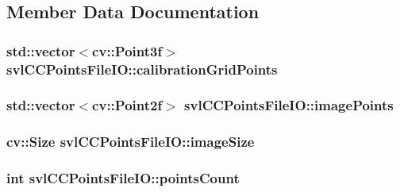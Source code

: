 \subsection{Member Data Documentation}
\hypertarget{classsvl_c_c_points_file_i_o_a72ec161d8c025afcf43920fe2dc27f79}{
\subsubsection[{calibration\-Grid\-Points}]{\setlength{\rightskip}{0pt plus 5cm}std\-::vector$<$cv\-::\-Point3f$>$ svl\-C\-C\-Points\-File\-I\-O\-::calibration\-Grid\-Points}}\label{classsvl_c_c_points_file_i_o_a72ec161d8c025afcf43920fe2dc27f79}
\hypertarget{classsvl_c_c_points_file_i_o_a08fcf34ffb6b2f651121d7ba3068795c}{
\subsubsection[{image\-Points}]{\setlength{\rightskip}{0pt plus 5cm}std\-::vector$<$cv\-::\-Point2f$>$ svl\-C\-C\-Points\-File\-I\-O\-::image\-Points}}\label{classsvl_c_c_points_file_i_o_a08fcf34ffb6b2f651121d7ba3068795c}
\hypertarget{classsvl_c_c_points_file_i_o_a4ffbc2aa614d24353a652b675652cde4}{
\subsubsection[{image\-Size}]{\setlength{\rightskip}{0pt plus 5cm}cv\-::\-Size svl\-C\-C\-Points\-File\-I\-O\-::image\-Size\hspace{0.3cm}{\ttfamily [protected]}}}\label{classsvl_c_c_points_file_i_o_a4ffbc2aa614d24353a652b675652cde4}
\hypertarget{classsvl_c_c_points_file_i_o_a60697899d8fa6bd4e3be94daae5af43b}{
\subsubsection[{points\-Count}]{\setlength{\rightskip}{0pt plus 5cm}int svl\-C\-C\-Points\-File\-I\-O\-::points\-Count\hspace{0.3cm}{\ttfamily [protected]}}}\label{classsvl_c_c_points_file_i_o_a60697899d8fa6bd4e3be94daae5af43b}
